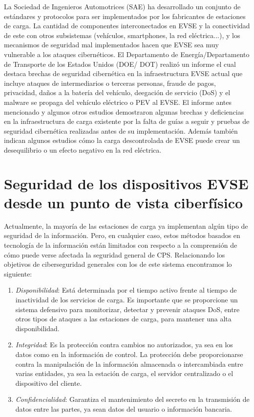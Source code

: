 \documentclass[12pt,a4paper,onecolumn,oneside]{report}
\begin{document}
La Sociedad de Ingenieros Automotrices (SAE) ha desarrollado un conjunto de estándares y protocolos para ser implementados por los fabricantes de estaciones de carga. La cantidad de componentes interconectados en EVSE y la conectividad de este con otros subsistemas (vehículos, smartphones, la red eléctrica...), y los mecanismos de seguridad mal implementados hacen que EVSE sea muy vulnerable a los ataques cibernéticos. El Departamento de Energía/Departamento de Transporte de los Estados Unidos (DOE/ DOT) realizó un informe el cual destaca brechas de seguridad cibernética en la infraestructura EVSE actual que incluye ataques de intermediarios o terceras personas, fraude de pagos, privacidad, daños a la batería del vehículo, deegación de servicio (DoS) y el malware se propaga del vehículo eléctrico o PEV al EVSE. El informe antes mencionado y algunos otros estudios \cite{once}\cite{doce}\cite{trece} demostraron algunas brechas y deficiencias en la infraestructura de carga existente por la falta de guías a seguir y pruebas de seguridad cibernética realizadas antes de su implementación. Además también indican algunos estudios cómo la carga descontrolada de EVSE puede crear un desequilibrio o un efecto negativo en la red eléctrica.


\section{Seguridad de los dispositivos EVSE desde un punto de vista ciberfísico}
\label{Seguridad de los dispositivos EVSE desde un punto de vista ciberfísico}

Actualmente, la mayoría de las estaciones de carga ya implementan algún tipo de seguridad de la información. Pero, en cualquier caso, estos métodos basados en tecnología de la información están limitados con respecto a la comprensión de cómo puede verse afectada la seguridad general de CPS. Relacionando los objetivos de ciberseguridad generales con los de este sistema encontramos lo siguiente:


\begin{enumerate}

\item \textit{Disponibilidad}: Está determinada por el tiempo activo frente al tiempo de inactividad de los servicios de carga. Es importante que se proporcione un sistema defensivo para monitorizar, detectar y prevenir ataques DoS, entre otros tipos de ataques a las estaciones de carga, para mantener una alta disponibilidad.
\item \textit{Integridad}: Es la protección contra cambios no autorizados, ya sea en los datos como en la información de control. La protección debe proporcionarse contra la manipulación de la información almacenada o intercambiada entre varias entidades, ya sea la estación de carga, el servidor centralizado o el dispositivo del cliente. 
\item \textit{Confidencialidad}: Garantiza el mantenimiento del secreto en la transmisión de datos entre las partes, ya sean datos del usuario o información bancaria.

\end{enumerate}
\end{document}
